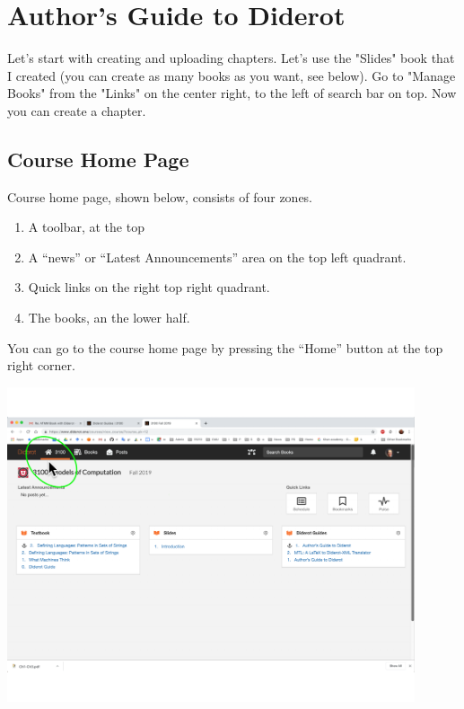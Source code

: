 \chapter{Author's Guide to Diderot}
\label{ch:guide}

%

Let's start with creating and uploading chapters.  Let's use the
"Slides" book that I created (you can create as many books as you
want, see below).  Go to "Manage Books" from the "Links" on the center
right, to the left of search bar on top.  Now you can create a
chapter.  

\section{Course Home Page}

\begin{gram}
Course home page, shown below, consists of four zones.
\begin{enumerate}
\item A toolbar, at the top
\item A ``news'' or ``Latest Announcements'' area on the top left quadrant.
\item Quick links on the right top right quadrant.
\item The books, an the lower half.
\end{enumerate}

You can go to the course home page by pressing the ``Home'' button at the top right corner.

\includegraphics[width=0.9\textwidth]{author/media/course-home.pdf}
\end{gram}

